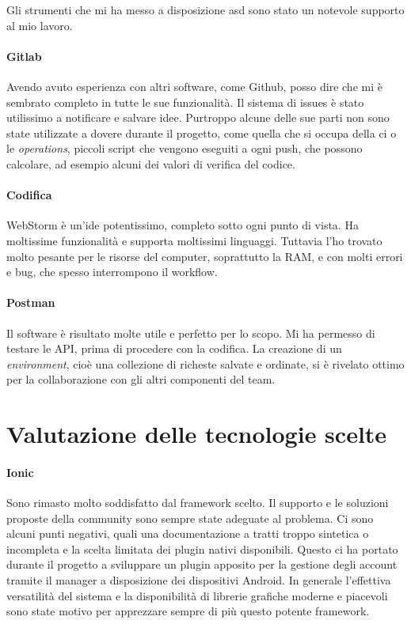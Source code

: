 Gli strumenti che mi ha messo a disposizione \acrlong{asd} sono stato un notevole supporto al mio lavoro.

\paragraph{Gitlab} Avendo avuto esperienza con altri software, come Github, posso dire che mi è sembrato completo in
tutte le sue funzionalità. Il sistema di issues è stato utilissimo a notificare e salvare idee. Purtroppo alcune delle
sue parti non sono state utilizzate a dovere durante il progetto, come quella che si occupa della \gls{ci} o le
\textit{operations}, piccoli script che vengono eseguiti a ogni push, che possono calcolare, ad esempio alcuni dei
valori di verifica del codice. 

\paragraph{Codifica} WebStorm è un'\gls{ide} potentissimo, completo sotto ogni punto di vista. Ha moltissime
funzionalità e supporta moltissimi linguaggi. Tuttavia l'ho trovato molto pesante per le risorse del computer,
soprattutto la RAM, e con molti errori e bug, che spesso interrompono il workflow. 

\paragraph{Postman} Il software è risultato molte utile e perfetto per lo scopo. Mi ha permesso di testare le API, prima
di procedere con la codifica. La creazione di un \textit{environment}, cioè una collezione di richeste salvate e
ordinate, si è rivelato ottimo per la collaborazione con gli altri componenti del team.

\section{Valutazione delle tecnologie scelte}
\paragraph{Ionic} Sono rimasto molto soddisfatto dal framework scelto. Il supporto e le soluzioni proposte della community sono
sempre state adeguate al problema. Ci sono alcuni punti negativi, quali una documentazione a tratti troppo sintetica o
incompleta e la scelta limitata dei plugin nativi disponibili. Questo ci ha portato durante il progetto a sviluppare un
plugin apposito per la gestione degli account tramite il manager a disposizione dei dispositivi Android. In generale
l'effettiva versatilità del sistema e la disponibilità di librerie grafiche moderne e piacevoli sono state motivo per
apprezzare sempre di più questo potente framework.

